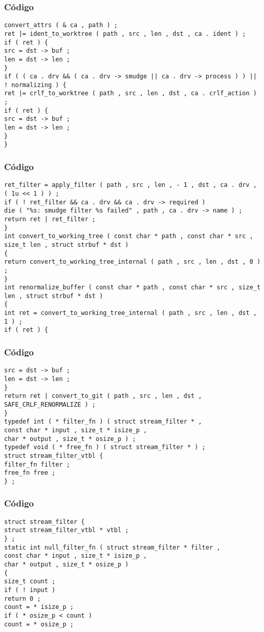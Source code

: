 \documentclass{beamer}
\begin{document}
\begin{frame}[fragile]
\frametitle{C\'odigo}
\begin{verbatim}
convert_attrs ( & ca , path ) ; 
ret |= ident_to_worktree ( path , src , len , dst , ca . ident ) ; 
if ( ret ) { 
src = dst -> buf ; 
len = dst -> len ; 
} 
if ( ( ca . drv && ( ca . drv -> smudge || ca . drv -> process ) ) || ! normalizing ) { 
ret |= crlf_to_worktree ( path , src , len , dst , ca . crlf_action ) ; 
if ( ret ) { 
src = dst -> buf ; 
len = dst -> len ; 
} 
} 
\end{verbatim}
\end{frame}
\begin{frame}[fragile]
\frametitle{C\'odigo}
\begin{verbatim}
ret_filter = apply_filter ( path , src , len , - 1 , dst , ca . drv , ( 1u << 1 ) ) ; 
if ( ! ret_filter && ca . drv && ca . drv -> required ) 
die ( "%s: smudge filter %s failed" , path , ca . drv -> name ) ; 
return ret | ret_filter ; 
} 
int convert_to_working_tree ( const char * path , const char * src , size_t len , struct strbuf * dst ) 
{ 
return convert_to_working_tree_internal ( path , src , len , dst , 0 ) ; 
} 
int renormalize_buffer ( const char * path , const char * src , size_t len , struct strbuf * dst ) 
{ 
int ret = convert_to_working_tree_internal ( path , src , len , dst , 1 ) ; 
if ( ret ) { 
\end{verbatim}
\end{frame}
\begin{frame}[fragile]
\frametitle{C\'odigo}
\begin{verbatim}
src = dst -> buf ; 
len = dst -> len ; 
} 
return ret | convert_to_git ( path , src , len , dst , SAFE_CRLF_RENORMALIZE ) ; 
} 
typedef int ( * filter_fn ) ( struct stream_filter * , 
const char * input , size_t * isize_p , 
char * output , size_t * osize_p ) ; 
typedef void ( * free_fn ) ( struct stream_filter * ) ; 
struct stream_filter_vtbl { 
filter_fn filter ; 
free_fn free ; 
} ; 
\end{verbatim}
\end{frame}
\begin{frame}[fragile]
\frametitle{C\'odigo}
\begin{verbatim}
struct stream_filter { 
struct stream_filter_vtbl * vtbl ; 
} ; 
static int null_filter_fn ( struct stream_filter * filter , 
const char * input , size_t * isize_p , 
char * output , size_t * osize_p ) 
{ 
size_t count ; 
if ( ! input ) 
return 0 ; 
count = * isize_p ; 
if ( * osize_p < count ) 
count = * osize_p ; 
\end{verbatim}
\end{frame}
\end{document}
